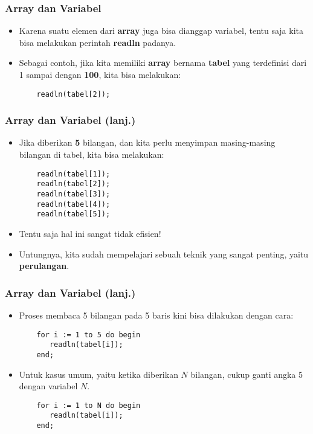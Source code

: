 \documentclass{beamer}
\begin{document}
\begin{frame}[fragile]
\frametitle{Array dan Variabel}
\begin{itemize}
    \item Karena suatu elemen dari \textbf{array} juga bisa dianggap variabel, tentu saja kita bisa melakukan perintah \textbf{readln} padanya.
    \item Sebagai contoh, jika kita memiliki \textbf{array} bernama \textbf{tabel} yang terdefinisi dari 1 sampai dengan \textbf{100}, kita bisa melakukan:
    \begin{lstlisting}
    readln(tabel[2]);
    \end{lstlisting}
\end{itemize}
\end{frame}

\begin{frame}[fragile]
\frametitle{Array dan Variabel (lanj.)}
\begin{itemize}
    \item Jika diberikan \textbf{5} bilangan, dan kita perlu menyimpan masing-masing bilangan di tabel, kita bisa melakukan:
    \begin{lstlisting}
    readln(tabel[1]);
    readln(tabel[2]);
    readln(tabel[3]);
    readln(tabel[4]);
    readln(tabel[5]);
    \end{lstlisting}
    \item Tentu saja hal ini sangat tidak efisien!
    \item Untungnya, kita sudah mempelajari sebuah teknik yang sangat penting, yaitu \textbf{perulangan}.
\end{itemize}
\end{frame}

\begin{frame}[fragile]
\frametitle{Array dan Variabel (lanj.)}
\begin{itemize}
    \item Proses membaca 5 bilangan pada 5 baris kini bisa dilakukan dengan cara:
    \begin{lstlisting}
    for i := 1 to 5 do begin
       readln(tabel[i]);
    end;
    \end{lstlisting}
    \item Untuk kasus umum, yaitu ketika diberikan $N$ bilangan, cukup ganti angka 5 dengan variabel $N$.
    \begin{lstlisting}
    for i := 1 to N do begin
       readln(tabel[i]);
    end;
    \end{lstlisting}
\end{itemize}
\end{frame}
\end{document}
